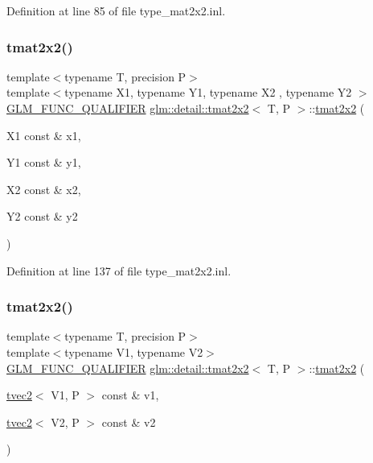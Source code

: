 Definition at line 85 of file type\+\_\+mat2x2.\+inl.

\mbox{\label{structglm_1_1detail_1_1tmat2x2_a9f87e4050f867fd35e7440996f569ab9}} 
\subsubsection{\texorpdfstring{tmat2x2()}{tmat2x2()}\hspace{0.1cm}{\footnotesize\ttfamily [20/22]}}
{\footnotesize\ttfamily template$<$typename T, precision P$>$ \\
template$<$typename X1, typename Y1, typename X2 , typename Y2 $>$ \\
\hyperlink{setup_8hpp_a33fdea6f91c5f834105f7415e2a64407}{G\+L\+M\+\_\+\+F\+U\+N\+C\+\_\+\+Q\+U\+A\+L\+I\+F\+I\+ER} \hyperlink{structglm_1_1detail_1_1tmat2x2}{glm\+::detail\+::tmat2x2}$<$ T, P $>$\+::\hyperlink{structglm_1_1detail_1_1tmat2x2}{tmat2x2} (\begin{DoxyParamCaption}\item[{X1 const \&}]{x1,  }\item[{Y1 const \&}]{y1,  }\item[{X2 const \&}]{x2,  }\item[{Y2 const \&}]{y2 }\end{DoxyParamCaption})}



Definition at line 137 of file type\+\_\+mat2x2.\+inl.

\mbox{\label{structglm_1_1detail_1_1tmat2x2_a469a15bf38fd19d4f7ad48f8599ea554}} 
\subsubsection{\texorpdfstring{tmat2x2()}{tmat2x2()}\hspace{0.1cm}{\footnotesize\ttfamily [21/22]}}
{\footnotesize\ttfamily template$<$typename T, precision P$>$ \\
template$<$typename V1, typename V2$>$ \\
\hyperlink{setup_8hpp_a33fdea6f91c5f834105f7415e2a64407}{G\+L\+M\+\_\+\+F\+U\+N\+C\+\_\+\+Q\+U\+A\+L\+I\+F\+I\+ER} \hyperlink{structglm_1_1detail_1_1tmat2x2}{glm\+::detail\+::tmat2x2}$<$ T, P $>$\+::\hyperlink{structglm_1_1detail_1_1tmat2x2}{tmat2x2} (\begin{DoxyParamCaption}\item[{\hyperlink{structglm_1_1detail_1_1tvec2}{tvec2}$<$ V1, P $>$ const \&}]{v1,  }\item[{\hyperlink{structglm_1_1detail_1_1tvec2}{tvec2}$<$ V2, P $>$ const \&}]{v2 }\end{DoxyParamCaption})}



